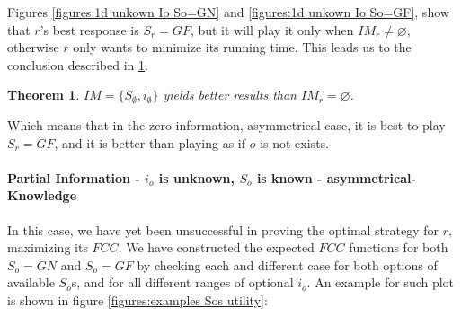 \documentclass[a4paper,english,10pt]{article}
\newtheorem{theorem}{Theorem}[section]
\newcommand\rob{\ensuremath{r}\xspace}
\newcommand\opp{\ensuremath{o}\xspace}
\newcommand{\fcc}{\ensuremath{FCC}\xspace}
\newcommand{\gn}{\ensuremath{GN}\xspace}
\newcommand{\gf}{\ensuremath{GF}\xspace}
\begin{document}
Figures \ref{figures:1d unkown Io So=GN} and \ref{figures:1d unkown Io So=GF}, show that \rob's best response is $S_\rob=\gf$, but it will play it only when $IM_\rob \neq \varnothing$, otherwise \rob only wants to minimize its running time. This leads us to the conclusion described in \ref{theorems: utility of no information}.

\begin{theorem}\label{theorems: utility of no information}
$IM=\lbrace S_\emptyset, i_\emptyset \rbrace$ yields better results than $IM_\rob=\varnothing$.
\end{theorem}

Which means that in the zero-information, asymmetrical case, it is best to play $S_\rob=\gf$, and it is better than playing as if \opp is not exists. 

\paragraph{Partial Information - $i_\opp$ is unknown, $S_\opp$ is known - asymmetrical-Knowledge} \label{sections:1D unknown io known so}
In this case, we have yet been unsuccessful in proving the optimal strategy for \rob, maximizing its \fcc. We have constructed the expected \fcc functions for both $S_\opp = \gn$ and $S_\opp = \gf$ by checking each and different case for both options of available $S_\opp$s, and for all different ranges of optional $i_\opp$. An example for such plot is shown in figure \ref{figures:examples Sos utility}:
\end{document}
